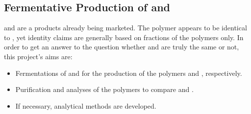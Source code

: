 \subsection{Fermentative Production of \SCL{} and \SHZ{}}
\SHZ{} and \SCL{} are a products already being marketed. The polymer \scl{} appears to be identical to \shz{}, yet identity claims are generally based on fractions of the polymers only. In order to get an answer to the question whether \scl{} and \shz{} are truly the same or not, this project's aims are:
\begin{itemize}
	\item Fermentations of \comm{} and \rolf{} for the production of the polymers \shz{} and \scl{}, respectively.
	\item Purification and analyses of the polymers to compare \scl{} and \shz{}.
	\item If necessary, analytical methods are developed.
\end{itemize}
 
